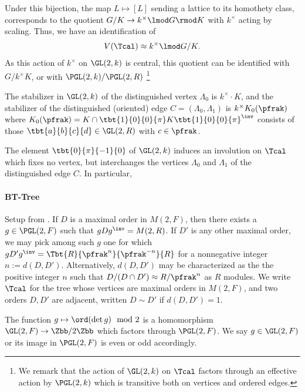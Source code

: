 \documentclass[draft]{amsart}
\begin{document}
Under this bijection, the map $L\mapsto [L]$ sending a lattice to its homothety class, corresponds to the quotient $G / K \to k^\times \lmod G \rmod K$ with $k^\times$ acting by scaling. Thus, we have an identification of
\begin{align*}
    V(\Tcal) \approx k^\times \lmod G/K.
\end{align*}
As this action of $k^\times$ on $\GL(2,k)$ is central, this quotient can be identified with $G/k^\times K$, or with $\PGL(2,k)/\PGL(2,R)$ \footnote{We remark that the action of $\GL(2,k)$ on $\Tcal$ factors through an effective action by $\PGL(2,k)$ which is transitive both on vertices and ordered edges.}

The stabilizer in $\GL(2,k)$ of the distinguished vertex $\Lambda_0$ is $k^\times \cdot K$, and the stabilizer of the distinguished (oriented) edge $C = (\Lambda_0,\Lambda_1)$ is $k^\times K_0(\pfrak)$ where $K_0(\pfrak)=K\cap \tbt{1}{0}{0}{\pi}K\tbt{1}{0}{0}{\pi}^\inv$ consists of those $\tbt{a}{b}{c}{d} \in \GL(2,R)$  with $c \in \pfrak$.

The element $\tbt{0}{\pi}{-1}{0}$ of $\GL(2,k)$ induces an involution on $\Tcal$ which fixes no vertex, but interchanges the vertices $\Lambda_0$ and $\Lambda_1$ of the distinguished edge $C$. In particular,


\paragraph*{BT-Tree}
Setup from \cite{chinburgEmbeddingTheoremQuaternion1999}. If $D$ is a maximal order in $M(2,F)$, then there exists a $g\in \PGL(2,F)$ such that $g D g^\inv = M(2,R)$. If $D'$ is any other maximal order, we may pick among such $g$ one for which $gD'g^\inv = \Tbt{R}{\pfrak^n}{\pfrak^{-n}}{R}$ for a nonnegative integer $n:=d(D,D')$. Alternatively, $d(D,D')$ may be characterized as the the positive integer $n$ such that $D/(D\cap D') \approx R/\pfrak^n$ as $R$ modules. We write $\Tcal$ for the tree whose vertices are maximal orders in $M(2,F)$, and two orders $D,D'$ are adjacent, written $D \sim D'$ if $d(D,D')=1$.

The function $g \mapsto \ord(\det g) \mod 2 $ is a homomorphism $\GL(2,F) \to \Zbb/2\Zbb$ which factors through $\PGL(2,F)$. We say $g\in \GL(2,F)$ or its image in $\PGL(2,F)$ is even or odd accordingly.
\end{document}
